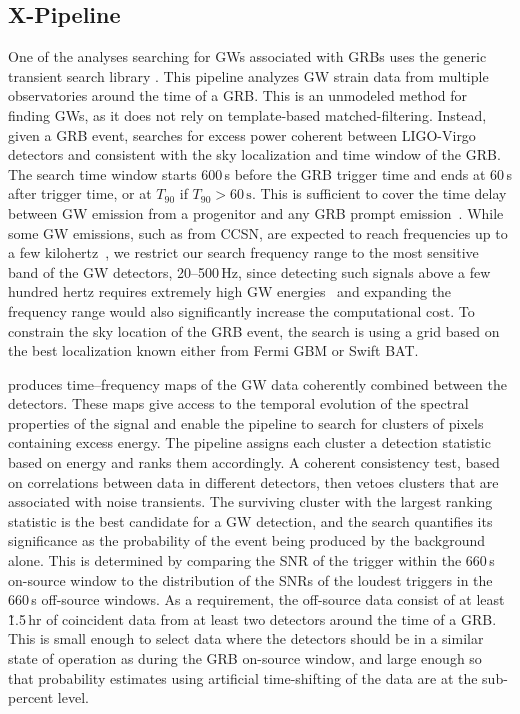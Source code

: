 \subsection{X-Pipeline}\label{sec:grb-x}

One of the analyses searching for \acp{GW} associated with \acp{GRB} uses the generic transient search library \xpip.
This pipeline analyzes \ac{GW} strain data from multiple observatories around the time of a \ac{GRB}.
This is an unmodeled method for finding \acp{GW}, as it does not rely on template-based matched-filtering.
Instead, given a \ac{GRB} event, \xpip searches for excess power coherent between LIGO-Virgo detectors and consistent with the sky localization and time window of the \ac{GRB}.
The search time window starts 600\,s before the GRB trigger time and ends at 60\,s after trigger time, or at $T_{90}$ if $T_{90} > 60\,\text{s}$.
This is sufficient to cover the time delay between GW emission from a progenitor and any GRB prompt emission~\citep{Koshut_1995, Aloy_2000, MacFadyen_2001, Zhang_2003, Lazzati_2005, Wang_2007, Burlon_2008, Burlon_2009, Lazzati_2009, Vedrenne_2009}.
While some GW emissions, such as from \ac{CCSN}, are expected to reach frequencies up to a few kilohertz~\citep{Radice_2019}, we restrict our search frequency range to the most sensitive band of the GW detectors, 20–500\,Hz, since detecting such signals above a few hundred hertz requires extremely high GW energies~\citep{burst_o2} and expanding the frequency range would also significantly increase the computational cost. To constrain the sky location of the GRB event, the search is using a grid based on the best localization known either from Fermi \ac{GBM} or Swift \ac{BAT}.

\xpip produces time–frequency maps of the \ac{GW} data coherently combined between the detectors.
These maps give access to the temporal evolution of the spectral properties of the signal and enable the pipeline to search for clusters of pixels containing excess energy.
The pipeline assigns each cluster a detection statistic based on energy and ranks them accordingly.
A coherent consistency test, based on correlations between data in different detectors, then vetoes clusters that are associated with noise transients.
The surviving cluster with the largest ranking statistic is the best candidate for a GW detection, and the search quantifies its significance as the probability of the event being produced by the background alone.
This is determined by comparing the \ac{SNR} of the trigger within the 660\,s on-source window to the distribution of the \acp{SNR} of the loudest triggers in the 660\,s off-source windows.
As a requirement, the off-source data consist of at least \~1.5\,hr of coincident data from at least two detectors around the time of a \ac{GRB}.
This is small enough to select data where the detectors should be in a similar state of operation as during the \ac{GRB} on-source window, and large enough so that probability estimates using artificial time-shifting of the data are at the sub-percent level.

